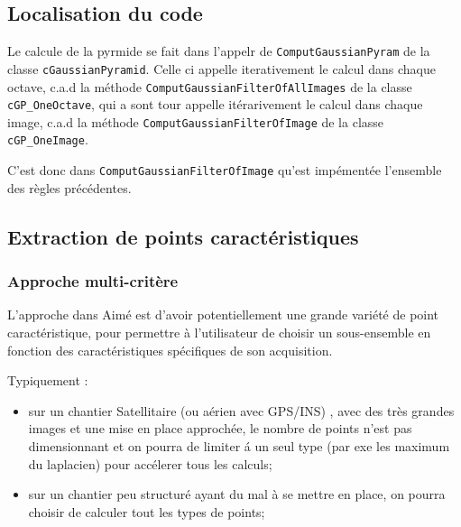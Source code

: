 
\subsection{Localisation du code}

Le calcule de la pyrmide se fait dans l'appelr de {\tt ComputGaussianPyram} de la
classe {\tt cGaussianPyramid}.  Celle ci appelle iterativement le calcul dans
chaque octave, c.a.d la méthode {\tt ComputGaussianFilterOfAllImages} de la classe {\tt cGP\_OneOctave},
qui a sont tour appelle it\'erarivement le calcul  dans chaque image, c.a.d la méthode
{\tt ComputGaussianFilterOfImage} de la classe {\tt cGP\_OneImage}.


C'est donc dans {\tt ComputGaussianFilterOfImage} qu'est impément\'ee l'ensemble des r\`egles 
précédentes.





\subsection{Extraction de points caract\'eristiques}


\subsubsection{Approche multi-crit\`ere }

L'approche dans Aim\'e est d'avoir potentiellement une grande vari\'et\'e de point caract\'eristique,
pour permettre \`a l'utilisateur de choisir un sous-ensemble en fonction des caract\'eristiques
sp\'ecifiques de son acquisition.

Typiquement :

\begin{itemize}
   \item sur un chantier Satellitaire (ou a\'erien avec GPS/INS) , avec 
         des tr\`es grandes images et une mise en place approch\'ee,
         le nombre de points n'est pas dimensionnant et on pourra de limiter \'a un seul type (par exe
         les maximum du laplacien) pour acc\'elerer tous les calculs;

   \item sur un chantier peu structur\'e ayant du mal \`a se mettre en place, on pourra choisir de
         calculer tout les types de points;
\end{itemize}

